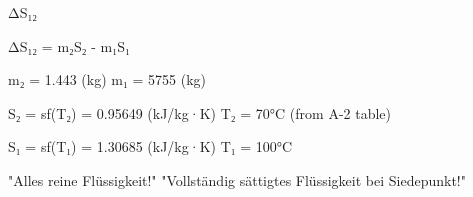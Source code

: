 ΔS₁₂  

ΔS₁₂ = m₂S₂ - m₁S₁  

m₂ = 1.443 (kg)  
m₁ = 5755 (kg)  

S₂ = sf(T₂) = 0.95649 (kJ/kg·K)  
T₂ = 70°C (from A-2 table)  

S₁ = sf(T₁) = 1.30685 (kJ/kg·K)  
T₁ = 100°C  

"Alles reine Flüssigkeit!"  
"Vollständig sättigtes Flüssigkeit bei Siedepunkt!"